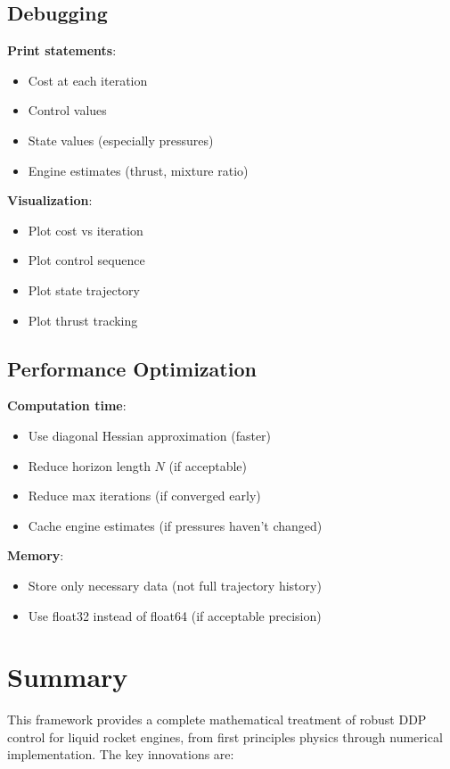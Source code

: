 \documentclass[11pt,a4paper]{article}
\begin{document}
\subsection{Debugging}

\textbf{Print statements}:
\begin{itemize}
    \item Cost at each iteration
    \item Control values
    \item State values (especially pressures)
    \item Engine estimates (thrust, mixture ratio)
\end{itemize}

\textbf{Visualization}:
\begin{itemize}
    \item Plot cost vs iteration
    \item Plot control sequence
    \item Plot state trajectory
    \item Plot thrust tracking
\end{itemize}

\subsection{Performance Optimization}

\textbf{Computation time}:
\begin{itemize}
    \item Use diagonal Hessian approximation (faster)
    \item Reduce horizon length $N$ (if acceptable)
    \item Reduce max iterations (if converged early)
    \item Cache engine estimates (if pressures haven't changed)
\end{itemize}

\textbf{Memory}:
\begin{itemize}
    \item Store only necessary data (not full trajectory history)
    \item Use float32 instead of float64 (if acceptable precision)
\end{itemize}

\section{Summary}

This framework provides a complete mathematical treatment of robust DDP control for liquid rocket engines, from first principles physics through numerical implementation. The key innovations are:
\end{document}

